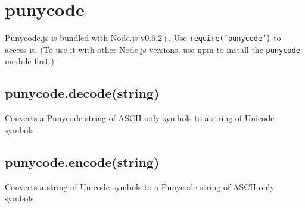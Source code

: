 \section{punycode}\label{punycode}

\begin{Shaded}
\begin{Highlighting}[]
 
\end{Highlighting}
\end{Shaded}

\href{http://mths.be/punycode}{Punycode.js} is bundled with Node.js
v0.6.2+. Use \texttt{require('punycode')} to access it. (To use it with
other Node.js versions, use npm to install the \texttt{punycode} module
first.)

\subsection{punycode.decode(string)}\label{punycode.decodestring}

Converts a Punycode string of ASCII-only symbols to a string of Unicode
symbols.

\begin{Shaded}
\begin{Highlighting}[]
\NormalTok{(}\NormalTok{); }
\NormalTok{(}\NormalTok{); }
\end{Highlighting}
\end{Shaded}

\subsection{punycode.encode(string)}\label{punycode.encodestring}

Converts a string of Unicode symbols to a Punycode string of ASCII-only
symbols.

\begin{Shaded}
\begin{Highlighting}[]
\NormalTok{(}\NormalTok{); }
\NormalTok{(}\NormalTok{); }
\end{Highlighting}
\end{Shaded}


